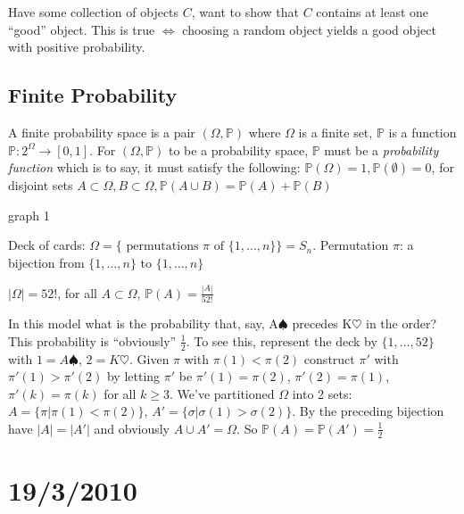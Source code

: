 \documentclass{article}
\begin{document}
\begin{rem}
Have some collection of objects $C$, want to show that $C$ contains at least one ``good'' object.  This is true $\iff$ choosing a random object yields a good object with positive probability.
\end{rem}

\subsection*{Finite Probability}

\begin{defn}
A finite probability space is a pair $(\Omega,\mathbb{P})$ where $\Omega$ is a finite set, $\mathbb{P}$ is a function $\mathbb{P} : 2^{\Omega} \rightarrow [0,1]$.  For $(\Omega,\mathbb{P})$ to be a probability space, $\mathbb{P}$ must be a \emph{probability function} which is to say, it must satisfy the following: $\mathbb{P}(\Omega) =1, \mathbb{P}(\emptyset) =0$, for disjoint sets $A \subset \Omega, B \subset \Omega, \mathbb{P}(A \cup B) = \mathbb{P}(A) + \mathbb{P}(B)$
\end{defn}
graph 1

\begin{examp}
Deck of cards: $\Omega = \{\text{ permutations } \pi \text{ of } \{1,\dots,n\}\} = S_n$.  Permutation $\pi$: a bijection from $\{1, \dots,n\}$ to $\{1, \dots,n\}$

 $ |\Omega| = 52!$, for all $A \subset \Omega$, $\mathbb{P}(A) = \frac{|A|}{52!}$

In this model what is the probability that, say, A$\spadesuit$ precedes K$\heartsuit$ in the order?  This probability is ``obviously'' $\frac{1}{2}$.  To see this, represent the deck by $\{1,\dots,52\}$ with $1=A\spadesuit$, $2=K\heartsuit$.  Given $\pi$ with $\pi(1) < \pi(2)$ construct $\pi'$ with $\pi'(1) > \pi'(2)$ by letting $\pi'$ be $\pi'(1) = \pi(2)$, $\pi'(2) = \pi(1)$, $\pi'(k)=\pi(k)$ for all $k \ge 3$.  We've partitioned $\Omega$ into 2 sets: $A= \{ \pi | \pi(1) < \pi(2) \}$, $A' = \{\sigma | \sigma(1) > \sigma(2) \}$.  By the preceding bijection have $|A|=|A'|$ and obviously $A \cup A' = \Omega$.  So $\mathbb{P}(A)= \mathbb{P}(A')= \frac{1}{2}$
\end{examp}

\section*{19/3/2010}
\end{document}
